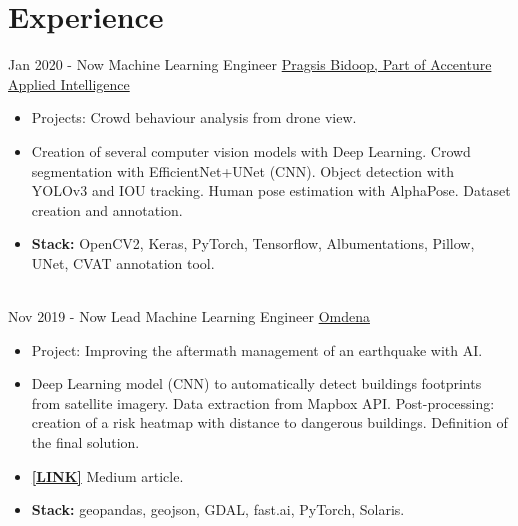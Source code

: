 \documentclass[letterpaper]{twentysecondcv} %
\begin{document}
\makeprofile %




\section{Experience}
\begin{twenty} %

\twentyitem
    	{Jan 2020 - }
		{Now}
        {Machine Learning Engineer}
        {\href{https://pragsis.com/}{Pragsis Bidoop, Part of Accenture Applied Intelligence}}
        {}
        {\begin{itemize}
			\item Projects: Crowd behaviour analysis from drone view.
			\item Creation of several computer vision models with Deep Learning. Crowd segmentation with EfficientNet+UNet (CNN). Object detection with YOLOv3 and IOU tracking. Human pose estimation with AlphaPose. Dataset creation and annotation.
			\item \textbf{Stack:} OpenCV2, Keras, PyTorch, Tensorflow, Albumentations, Pillow, UNet, CVAT annotation tool.
        \end{itemize}}
        \\
\twentyitem
    	{Nov 2019 - }
		{Now}
        {Lead Machine Learning Engineer}
        {\href{https://omdena.com}{Omdena}}
        {}
        {\begin{itemize}
			\item Project: Improving the aftermath management of an earthquake with AI.
			\item Deep Learning model (CNN) to automatically detect buildings footprints from satellite imagery. Data extraction from Mapbox API. Post-processing: creation of a risk heatmap with distance to dangerous buildings. Definition of the final solution.
			\item {\href{https://medium.com/omdena/estimating-street-safeness-after-an-earthquake-with-deep-learning-f2ae50b9e25e}{\textbf{[LINK]}}} Medium article.
			\item \textbf{Stack:} geopandas, geojson, GDAL, fast.ai, PyTorch, Solaris.

\end{itemize}}
\end{twenty}
\end{document}
